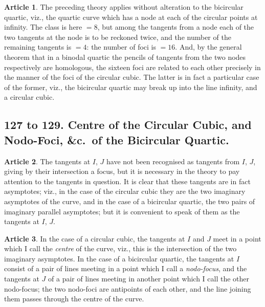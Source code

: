 \documentclass[11pt,a4paper]{article}
\theoremstyle{definition}
\newtheorem{art}{Article}
\begin{document}
\begin{art}
The preceding theory applies without alteration to the bicircular quartic, viz., the quartic curve which has a node at each of the circular points at infinity. The class is here $= 8$, but among the tangents from a node each of the two tangents at the node is to be reckoned twice, and the number of the remaining tangents is $= 4$: the number of foci is $= 16$. And, by the general theorem that in a binodal quartic the pencils of tangents from the two nodes respectively are homologous, the sixteen foci are related to each other precisely in the manner of the foci of the circular cubic. The latter is in fact a particular case of the former, viz., the bicircular quartic may break up into the line infinity, and a circular cubic.
\end{art}

\subsection*{127 to 129. Centre of the Circular Cubic, and Nodo-Foci, \&c.\ of the Bicircular Quartic.}

\begin{art}
The tangents at $I$, $J$ have not been recognised as tangents from $I$, $J$, giving by their intersection a focus, but it is necessary in the theory to pay attention to the tangents in question. It is clear that these tangents are in fact asymptotes; viz., in the case of the circular cubic they are the two imaginary asymptotes of the curve, and in the case of a bicircular quartic, the two pairs of imaginary parallel asymptotes; but it is convenient to speak of them as the tangents at $I$, $J$.
\end{art}

\begin{art}
In the case of a circular cubic, the tangents at $I$ and $J$ meet in a point which I call the \textit{centre} of the curve, viz., this is the intersection of the two imaginary asymptotes. In the case of a bicircular quartic, the tangents at $I$ consist of a pair of lines meeting in a point which I call a \textit{nodo-focus}, and the tangents at $J$ of a pair of lines meeting in another point which I call the other nodo-focus; the two nodo-foci are antipoints of each other, and the line joining them passes through the centre of the curve.
\end{art}
\end{document}
